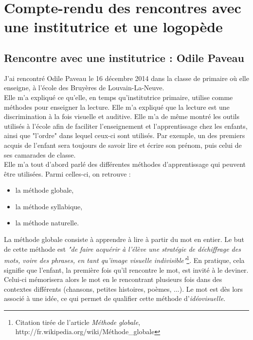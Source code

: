 \appendix
\makeatletter
\def\@seccntformat#1{Annexe~\csname the#1\endcsname:\quad}
\makeatother
\renewcommand{\thesection}{\Roman{section}}    %
\section{Compte-rendu des rencontres avec une institutrice et une logopède \label{annexeInterview}}
\subsection*{Rencontre avec une institutrice : Odile Paveau}
J'ai rencontré Odile Paveau le 16 décembre 2014 dans la classe de primaire où elle enseigne, à l'école des Bruyères de Louvain-La-Neuve. \\

Elle m'a expliqué ce qu'elle, en temps qu'institutrice primaire, utilise comme méthodes pour enseigner la lecture. Elle m'a expliqué que la lecture est une discrimination à la fois visuelle et auditive. Elle m'a de même montré les outils utilisés à l'école afin de faciliter l'enseignement et l'apprentissage chez les enfants, ainsi que "l'ordre" dans lequel ceux-ci sont utilisés. Par exemple, un des premiers acquis de l'enfant sera toujours de savoir lire et écrire son prénom, puis celui de ses camarades de classe.\\

Elle m'a tout d'abord parlé des différentes méthodes d'apprentissage qui peuvent être utilisées. Parmi celles-ci, on retrouve :
\begin{itemize}
\item la méthode globale,
\item la méthode syllabique,
\item la méthode naturelle.\\
\end{itemize}

La méthode globale consiste à apprendre à lire à partir du mot en entier. Le but de cette méthode est \textit{"de faire acquérir à l'élève une stratégie de déchiffrage des mots, voire des phrases, en tant qu'image visuelle indivisible"}\footnote{Citation tirée de l'article \textit{Méthode globale}, http://fr.wikipedia.org/wiki/Méthode\_globale}. En pratique, cela signifie que l'enfant, la première fois qu'il rencontre le mot, est invité à le deviner. Celui-ci mémorisera alors le mot en le rencontrant plusieurs fois dans des contextes différents (chansons, petites histoires, poèmes, ...). Le mot est dès lors associé à une idée, ce qui permet de qualifier cette méthode d'\textit{idéovisuelle}.\\

